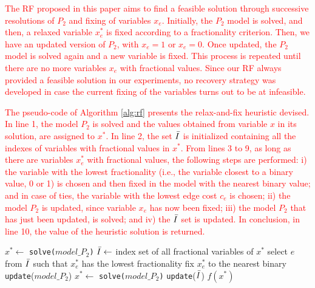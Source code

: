 \documentclass{ro}
\begin{document}
\textcolor{red}{
The RF proposed in this paper aims to find a feasible solution through successive resolutions of $P_2$ and fixing of variables $x_e$. Initially, the $P_2$ model is solved, and then, a relaxed variable $x_e^*$ is fixed according to a fractionality criterion. Then, we have an updated version of $P_2$, with $x_e=1$ or $x_e=0$. Once updated, the $P_2$ model is solved again  and a new variable is fixed. This process is repeated until there are no more variables $x_e$ with fractional values. Since our RF always provided a feasible solution in our experiments, no recovery strategy was developed in case the current fixing of the variables turns out to be at infeasible.}


\textcolor{red}{
The pseudo-code of Algorithm \ref{alg:rf} presents the relax-and-fix heuristic devised. In line 1, the model $P_2$ is solved and the values obtained from variable $x$ in its solution, are assigned to $x^*$. In line 2, the set $\Bar{I}$ is initialized containing all the indexes of variables with fractional values in $x^*$. From lines 3 to 9, as long as there are variables $x_e^*$ with fractional values, the following steps are performed: i) the variable with the lowest fractionality (i.e., the variable closest to a binary value, 0 or 1) is chosen and then fixed in the model with the nearest binary value; \textcolor{red}{and in case of ties, the variable with the lowest edge cost $c_e$ is chosen}; ii) the model $P_2$ is updated, since variable $x_e$ has now been fixed; iii) the model $P_2$ that has just been updated, is solved; and iv) the $\Bar{I}$ set is updated. In conclusion, in line 10, the value of the heuristic solution is returned.
}

\begin{algorithm}[!h]
	\caption{\hspace{-1mm}\textbf{: RF }($model\_P_2$)}
	\label{alg:rf}
	{\footnotesize
		\begin{algorithmic}[1]	
			\STATE $x^*\gets$ \texttt{solve($model\_P_2$)} 
			\STATE $\Bar{I} \gets$ index set of all fractional variables of $x^*$
			\STATE select $e$ from $\Bar{I}$ such that $x^*_e$ has the lowest fractionality 
			\STATE fix $x^*_e$ to the nearest binary
			\STATE \texttt{update}($model\_P_2$)
			\STATE $ x^*\gets$ \texttt{solve($model\_P_2$)} 
			\STATE \texttt{update}($\Bar{I}$)
			\ENDWHILE
			\RETURN $f(x^*)$
		\end{algorithmic}
	}
\end{algorithm}
\end{document}
